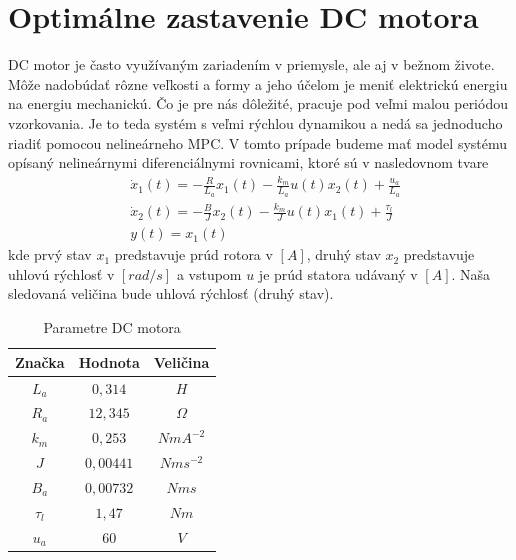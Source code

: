 \section{Optimálne zastavenie DC motora}

DC motor je často využívaným zariadením v priemysle, ale aj v bežnom živote. Môže nadobúdať rôzne veľkosti a formy a jeho účelom je meniť elektrickú energiu na energiu mechanickú. Čo je pre nás dôležité, pracuje pod veľmi malou periódou vzorkovania. Je to teda systém s veľmi rýchlou dynamikou a nedá sa jednoducho riadiť pomocou nelineárneho MPC. 
\label{math:model_DC}
V tomto prípade budeme mať model systému opísaný nelineárnymi diferenciálnymi rovnicami, ktoré sú v nasledovnom tvare
\begin{align}
& \dot{x}_1(t) = - \frac{R}{L_{a}}x_1(t) - \frac{k_{m}}{L_{a}}u(t)x_{2}(t) + \frac{u_a}{L_a}\\
& \dot{x}_2(t) = - \frac{B}{J}x_2(t) - \frac{k_{m}}{J}u(t)x_{1}(t) + \frac{\tau_l}{J}\\
& y(t) = x_{1}(t)
\end{align}
kde prvý stav $x_{1}$ predstavuje prúd rotora v $[A]$, druhý stav $x_{2}$ predstavuje uhlovú rýchlosť v $[rad/s]$ a vstupom $u$ je prúd statora udávaný v $[A]$. Naša sledovaná veličina bude uhlová rýchlosť (druhý stav)\cite{bib2}.
\begin{table}[h!]
	\centering
	\caption{Parametre DC motora \cite{bib2}}
	\label{tab.1: Parametre DC motora}
	\begin{tabular}{c c c}
		\hline
		\textbf{Značka} & \textbf{Hodnota} & \textbf{Veličina} \\ \hline
		$L_{a}$ & $0,314$ & $H$ \\ 
		$R_{a}$ & $12,345$ & $\Omega$ \\ 
		$k_{m}$ & $0,253$ & $N m A^{-2}$ \\ 
		$J$ & $0,00441$ & $N m s^{-2}$ \\ 
		$B_{a}$ & $ 0,00732$ & $N m s$ \\ 
		$\tau_l$ & $1,47$ & $N m$ \\
		$u_{a}$ & $60$ & $V$ \\ \hline
	\end{tabular}
\end{table}


